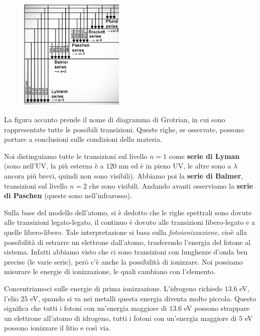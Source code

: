 \begin{minipage}{0.345\textwidth}
  \begin{figure}[H]
    \centering
    \includegraphics[width=5cm]{28-10.25(serie_idrogeno).png}
    \label{fig:serie_idrogeno}
  \end{figure}
\end{minipage}
\begin{minipage}{0.65\textwidth}
  \vspace{0.4cm}La figura accanto prende il nome di diagramma di Grotrian, in cui sono rappresentate tutte le possibili transizioni. Queste righe, se osservate, possono portare a conclusioni sulle condizioni della materia.

  Noi distinguiamo tutte le transizioni sul livello $n=1$ come \textbf{serie di Lyman} (sono nell'UV, la più esterna è a $120$ nm ed è in pieno UV, le altre sono a $\lambda$ ancora più brevi, quindi non sono visibili). Abbiamo poi la \textbf{serie di Balmer}, transizioni sul livello $n=2$ che sono visibili. Andando avanti osserviamo la \textbf{serie di Paschen} (queste sono nell'infrarosso).
\end{minipage}

\vspace{0.2cm}Sulla base del modello dell'atomo, si è dedotto che le righe spettrali sono dovute alle transizioni legato-legato, il continuo è dovuto alle transizioni libero-legato e a quelle libero-libero. Tale interpretazione si basa sulla \textit{fotoionizzazione}, cioè alla possibilità di estrarre un elettrone dall'atomo, trasferendo l'energia del fotone al sistema. Infatti abbiamo visto che ci sono transizioni con lunghezze d'onda ben precise (le varie serie), però c'è anche la possibilità di ionizzare. Noi possiamo misurare le energie di ionizzazione, le quali cambiano con l'elemento.

Concentriamoci sulle energie di prima ionizzazione. L'idrogeno richiede $13.6$ eV, l'elio $25$ eV, quando si va nei metalli questa energia diventa molto piccola. Questo significa che tutti i fotoni con un'energia maggiore di $13.6$ eV possono strappare un elettrone all'atomo di idrogeno, tutti i fotoni con un'energia maggiore di $5$ eV possono ionizzare il litio e così via.

